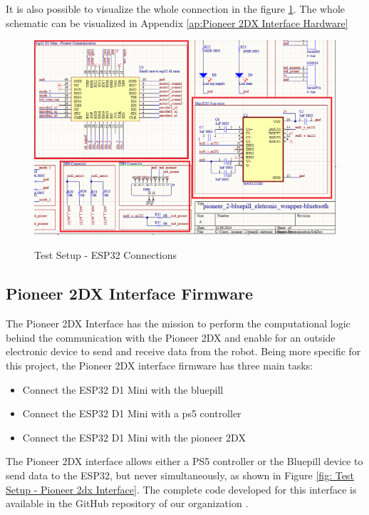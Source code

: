 \documentclass[../../../monografia.tex]{subfiles}
\begin{document}
It is also possible to visualize the whole connection in the figure \ref{fig: Test Setup - ESP32 Connections}. The whole schematic can be visualized in Appendix \ref{ap:Pioneer 2DX Interface Hardware}

\begin{figure}[h!]
    \caption{Test Setup - ESP32 Connections}
    \centering
    \includegraphics[width=16cm]{test_setup-hardware_connection.png}
    \label{fig: Test Setup - ESP32 Connections}
\end{figure}

\subsection{Pioneer 2DX Interface Firmware}

The Pioneer 2DX Interface has the mission to perform the computational logic behind the communication with the Pioneer 2DX and enable for an outside electronic device to send and receive data from the robot. Being more specific for this project, the Pioneer 2DX interface firmware has three main tasks:

\begin{itemize}
    \item {Connect the ESP32 D1 Mini with the bluepill}
    \item {Connect the ESP32 D1 Mini with a ps5 controller}
    \item {Connect the ESP32 D1 Mini with the pioneer 2DX}
\end{itemize}

The Pioneer 2DX interface allows either a PS5 controller or the Bluepill device to send data to the ESP32, but never simultaneously, as shown in Figure \ref{fig: Test Setup - Pioneer 2dx Interface}. The complete code developed for this interface is available in the GitHub repository of our organization \cite{pioneer_2dx_interface_esp32_2024}.
\end{document}
